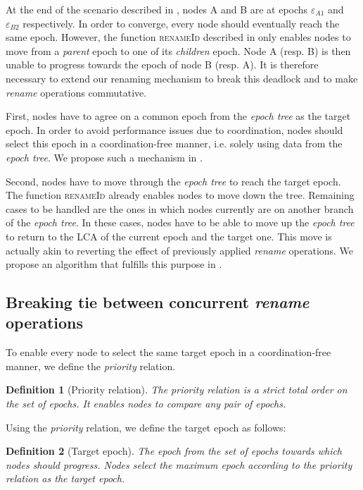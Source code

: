 \documentclass[10pt,journal,compsoc]{IEEEtran}
\newtheorem{definition}{Definition}
\newcommand{\ie}{i.e. }
\newcommand{\epoch}[1]{$\varepsilon_{#1}$}
\begin{document}
At the end of the scenario described in , nodes A and B are at epochs \epoch{A1} and \epoch{B2} respectively.
In order to converge, every node should eventually reach the same epoch.
However, the function \textsc{renameId} described in  only enables nodes to move from a \emph{parent} epoch to one of its \emph{children} epoch.
Node A (resp. B) is then unable to progress towards the epoch of node B (resp. A).
It is therefore necessary to extend our renaming mechanism to break this deadlock and to make \emph{rename} operations commutative.

First, nodes have to agree on a common epoch from the \emph{epoch tree} as the target epoch.
In order to avoid performance issues due to coordination, nodes should select this epoch in a coordination-free manner, \ie solely using data from the \emph{epoch tree}.
We propose such a mechanism in .

Second, nodes have to move through the \emph{epoch tree} to reach the target epoch.
The function \textsc{renameId} already enables nodes to move down the tree.
Remaining cases to be handled are the ones in which nodes currently are on another branch of the \emph{epoch tree}.
In these cases, nodes have to be able to move up the \emph{epoch tree} to return to the \ac{LCA} of the current epoch and the target one.
This move is actually akin to reverting the effect of previously applied \emph{rename} operations.
We propose an algorithm that fulfills this purpose in .

\subsection{Breaking tie between concurrent \emph{rename} operations}
\label{sec:priority}

To enable every node to select the same target epoch in a coordination-free manner, we define the \emph{priority} relation.

\begin{definition}[Priority relation]
    The \emph{priority} relation is a strict total order on the set of epochs.
    It enables nodes to compare any pair of epochs.
\end{definition}

Using the \emph{priority} relation, we define the target epoch as follows:

\begin{definition}[Target epoch]
    The epoch from the set of epochs towards which nodes should progress.
    Nodes select the maximum epoch according to the \emph{priority} relation as the target epoch.
\end{definition}
\end{document}
